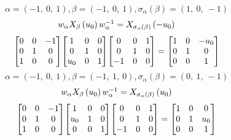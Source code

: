 \documentclass[11pt]{article}
\theoremstyle{definition}
\begin{document}
\providecommand{\scaletoalign}[2]{%
  \sbox0{$#2$}%
  \ifdim\wd0>#1\relax 
    \resizebox{#1}{!}{\usebox0}%
  \else 
    \usebox0%
  \fi 
}
\[
\alpha = \left( -1, \  0, \  1\right), \beta = \left( -1, \  0, \  1\right), \sigma_{\alpha}(\beta) = \left( 1, \  0, \  -1\right)
\]
\[
\scaletoalign{\textwidth}{w_{\alpha} X_{\beta}\left(u_{0}\right) w_{\alpha}^{-1} = X_{\sigma_{\alpha}\left(\beta\right)}\left(- u_{0}\right)}
\]
\[
\scaletoalign{\textwidth}{{\left[\begin{matrix}0 & 0 & -1\\0 & 1 & 0\\1 & 0 & 0\end{matrix}\right]} {\left[\begin{matrix}1 & 0 & 0\\0 & 1 & 0\\u_{0} & 0 & 1\end{matrix}\right]} {\left[\begin{matrix}0 & 0 & 1\\0 & 1 & 0\\-1 & 0 & 0\end{matrix}\right]} = {\left[\begin{matrix}1 & 0 & - u_{0}\\0 & 1 & 0\\0 & 0 & 1\end{matrix}\right]}}
\]
\[
\alpha = \left( -1, \  0, \  1\right), \beta = \left( -1, \  1, \  0\right), \sigma_{\alpha}(\beta) = \left( 0, \  1, \  -1\right)
\]
\[
\scaletoalign{\textwidth}{w_{\alpha} X_{\beta}\left(u_{0}\right) w_{\alpha}^{-1} = X_{\sigma_{\alpha}\left(\beta\right)}\left(u_{0}\right)}
\]
\[
\scaletoalign{\textwidth}{{\left[\begin{matrix}0 & 0 & -1\\0 & 1 & 0\\1 & 0 & 0\end{matrix}\right]} {\left[\begin{matrix}1 & 0 & 0\\u_{0} & 1 & 0\\0 & 0 & 1\end{matrix}\right]} {\left[\begin{matrix}0 & 0 & 1\\0 & 1 & 0\\-1 & 0 & 0\end{matrix}\right]} = {\left[\begin{matrix}1 & 0 & 0\\0 & 1 & u_{0}\\0 & 0 & 1\end{matrix}\right]}}
\]
\end{document}
